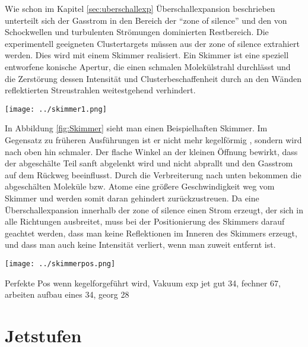 Wie schon im Kapitel \ref{sec:uberschallexp} Überschallexpansion beschrieben unterteilt sich der Gasstrom in den Bereich der \enquote{zone of silence} und den von Schockwellen und turbulenten Strömungen dominierten Restbereich. Die experimentell geeigneten Clustertargets müssen aus der zone of silence extrahiert werden. Dies wird mit einem Skimmer realisiert. Ein Skimmer ist eine speziell entworfene konische Apertur, die einen schmalen Molekülstrahl durchlässt und die Zerstörung dessen Intensität und Clusterbeschaffenheit durch an den Wänden reflektierten Streustrahlen weitestgehend verhindert. 
\begin{center}
\begin{minipage}{\linewidth}
\centering
\texttt{[image: ../skimmer1.png]}%
 \label{fig:Skimmer}
\end{minipage} 
\end{center} 
In Abbildung \ref{fig:Skimmer} sieht man einen Beispielhaften Skimmer. Im Gegensatz zu früheren Ausführungen ist er nicht mehr kegelförmig , sondern wird nach oben hin schmaler. Der flache Winkel an der kleinen Öffnung bewirkt, dass der abgeschälte Teil sanft abgelenkt wird und nicht abprallt und den Gasstrom auf dem Rückweg beeinflusst. Durch die Verbreiterung nach unten bekommen die abgeschälten Moleküle bzw. Atome eine größere Geschwindigkeit weg vom Skimmer und werden somit daran gehindert zurückzustreuen.
Da eine Überschallexpansion innerhalb der zone of silence einen Strom erzeugt, der sich in alle Richtungen ausbreitet, muss bei der Positionierung des Skimmers darauf geachtet werden, dass man keine Reflektionen im Inneren des Skimmers erzeugt, und dass man auch keine Intensität verliert, wenn man zuweit entfernt ist.
%
\begin{center}
\begin{minipage}{\linewidth}
\centering
\texttt{[image: ../skimmerpos.png]}%
 \label{fig:Skimmerpos}
\end{minipage} 
\end{center} 


Perfekte Pos wenn kegelforgeführt wird, Vakuum exp jet gut 34, fechner 67, arbeiten aufbau eines 34, georg 28





\section{Jetstufen}








%
%
%
%
%
%
